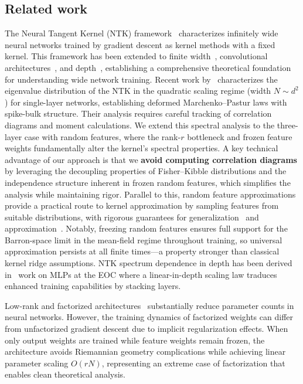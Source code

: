 \vspace{1em}
\subsection{Related work}


The Neural Tangent Kernel (NTK) framework~\cite{jacot2018neural} characterizes infinitely wide neural networks trained by gradient descent as kernel methods 
with a fixed kernel. This framework has been extended to finite width~\cite{arora2019exact}, convolutional architectures~\cite{arora2019harnessing}, and
 depth~\cite{yang2019scaling,terjek2022depth}, establishing a comprehensive theoretical foundation for understanding wide network training. Recent work
  by~\cite{benigni2025eigenvaluedistributionneuraltangent} characterizes the eigenvalue distribution of the NTK in the quadratic scaling regime (width \( N \sim d^2 \)) 
  for single-layer networks, establishing deformed Marchenko–Pastur laws with spike-bulk structure. Their analysis requires careful tracking of correlation diagrams and
   moment calculations. We extend this spectral analysis to the three-layer case with random features, where the rank-\( r \) bottleneck and frozen feature weights 
   fundamentally alter the kernel's spectral properties. A key technical advantage of our approach is that we \textbf{avoid computing correlation diagrams} by
    leveraging the decoupling properties of Fisher–Kibble distributions and the independence structure inherent in frozen random features, which simplifies the 
    analysis while maintaining rigor. Parallel to this, random feature approximations~\cite{rahimi2007random,rahimi2008weighted} provide a practical route to kernel
     approximation by sampling features from suitable distributions, with rigorous guarantees for generalization~\cite{bach2017breaking,rudi2017generalization} and
      approximation~\cite{sriperumbudur2015optimal}. Notably, freezing random features ensures full support for the Barron-space limit in the mean-field regime throughout training, so universal approximation persists 
      at all finite times—a property stronger than classical kernel ridge assumptions. NTK spectrum dependence in depth has been derived in \ work on MLPs at the EOC \cite{terjék2025mlpseocspectrumntk}
      where a linear-in-depth scaling law traduces enhanced training capabilities by stacking layers.

Low-rank and factorized architectures~\cite{sainath2013low,novikov2015tensorizing,arora2018optimization} substantially reduce parameter counts in neural networks. 
However, the training dynamics of factorized weights can differ from unfactorized gradient descent due to implicit regularization effects. When only output weights 
are trained while feature weights remain frozen, the architecture avoids Riemannian geometry complications while achieving linear parameter scaling \( O(rN) \),
 representing an extreme case of factorization that enables clean theoretical analysis.

